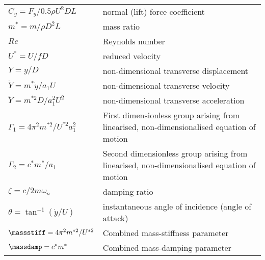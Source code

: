 \begin{tabular}{ll}
$C_y=F_y/0.5\rho U^2DL$ & normal (lift) force coefficient \\
$m^*=m/\rho D^2L$ & mass ratio \\
$Re$ & Reynolds number  \\
$U^*=U/fD$ & reduced velocity  \\
$Y=y/D$ & non-dimensional transverse displacement \\
$\dot{Y}=m^*\dot{y}/a_1U$ & non-dimensional transverse velocity \\
$\ddot{Y}=m^{*2}D/a_1^2U^2$ & non-dimensional transverse acceleration \\
$\Gamma_1 = 4\pi^2m^{*2}/U^{*2}a_1^2$ & First dimensionless group arising from linearised, non-dimensionalised equation of motion\\
$\Gamma_2 = c^*m^*/a_1$ & Second dimensionless group arising from linearised, non-dimensionalised equation of motion\\
$\zeta= c/2 m \omega_n$ & damping ratio \\
$\theta= \tan^{-1}{(\dot{y}/U)}$ & instantaneous angle of incidence (angle of attack)\\
$\massstiff =  4\pi^2m^{*2}/U^{*2}$ & Combined mass-stiffness parameter\\
$\massdamp = c^*m^*$ & Combined mass-damping parameter\\
\end{tabular}  